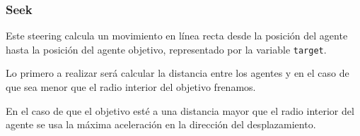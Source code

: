 \subsubsection{Seek}

Este steering calcula un movimiento en línea recta desde la posición del agente hasta la posición del agente objetivo, representado por la variable \texttt{target}.

Lo primero a realizar será calcular la distancia entre los agentes y en el caso de que sea menor que el radio interior del objetivo  frenamos.



En el caso de que el objetivo esté a una distancia mayor que el radio interior del agente se usa la máxima aceleración en la dirección del desplazamiento.


